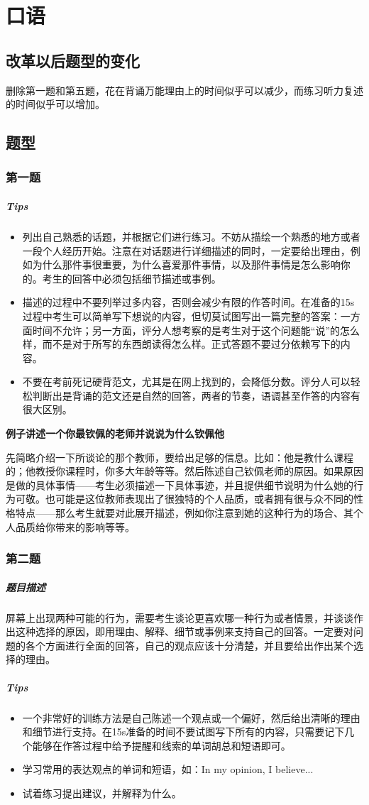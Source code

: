 \documentclass[UTF8]{ctexart}
\begin{document}
\section{口语}
\subsection{改革以后题型的变化}
删除第一题和第五题，花在背诵万能理由上的时间似乎可以减少，而练习听力复述的时间似乎可以增加。
\subsection{题型}
\subsubsection{第一题}
\subparagraph{Tips}
  \begin{itemize}
    \item 列出自己熟悉的话题，并根据它们进行练习。不妨从描绘一个熟悉的地方或者一段个人经历开始。注意在对话题进行详细描述的同时，一定要给出理由，例如为什么那件事很重要，为什么喜爱那件事情，以及那件事情是怎么影响你的。考生的回答中必须包括细节描述或事例。
    \item 描述的过程中不要列举过多内容，否则会减少有限的作答时间。在准备的15s过程中考生可以简单写下想说的内容，但切莫试图写出一篇完整的答案：一方面时间不允许；另一方面，评分人想考察的是考生对于这个问题能“说”的怎么样，而不是对于所写的东西朗读得怎么样。正式答题不要过分依赖写下的内容。
    \item 不要在考前死记硬背范文，尤其是在网上找到的，会降低分数。评分人可以轻松判断出是背诵的范文还是自然的回答，两者的节奏，语调甚至作答的内容有很大区别。
  \end{itemize}
  \textbf{例子讲述一个你最钦佩的老师并说说为什么钦佩他}\par
  先简略介绍一下所谈论的那个教师，要给出足够的信息。比如：他是教什么课程的；他教授你课程时，你多大年龄等等。然后陈述自己钦佩老师的原因。如果原因是做的具体事情——考生必须描述一下具体事迹，并且提供细节说明为什么她的行为可敬。也可能是这位教师表现出了很独特的个人品质，或者拥有很与众不同的性格特点——那么考生就要对此展开描述，例如你注意到她的这种行为的场合、其个人品质给你带来的影响等等。
\subsubsection{第二题}
\subparagraph{题目描述}
屏幕上出现两种可能的行为，需要考生谈论更喜欢哪一种行为或者情景，并谈谈作出这种选择的原因，即用理由、解释、细节或事例来支持自己的回答。一定要对问题的各个方面进行全面的回答，自己的观点应该十分清楚，并且要给出作出某个选择的理由。
\subparagraph{Tips}
\begin{itemize}
  \item 一个非常好的训练方法是自己陈述一个观点或一个偏好，然后给出清晰的理由和细节进行支持。在15s准备的时间不要试图写下所有的内容，只需要记下几个能够在作答过程中给予提醒和线索的单词胡总和短语即可。
  \item 学习常用的表达观点的单词和短语，如：In my opinion, I believe...
  \item 试着练习提出建议，并解释为什么。
\end{itemize}
\end{document}
